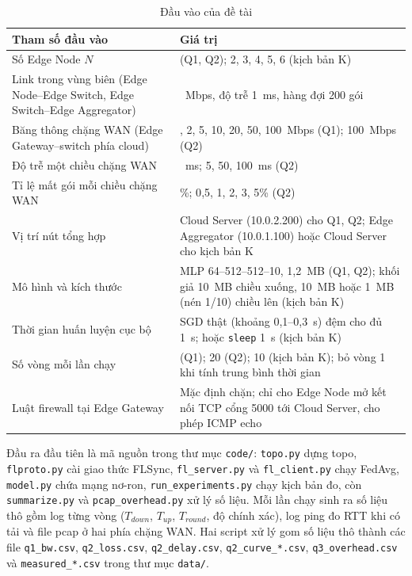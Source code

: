 \begin{table}[H]
    \centering
    \caption{Đầu vào của đề tài}
    \label{tab:input}
    \begin{tabularx}{\textwidth}{>{\raggedright\arraybackslash\hsize=0.8\hsize}X >{\raggedright\arraybackslash\hsize=1.2\hsize}X}
        \toprule
        \textbf{Tham số đầu vào} & \textbf{Giá trị} \\
        \midrule
        Số Edge Node $N$ & 4 (Q1, Q2); 2, 3, 4, 5, 6 (kịch bản K) \\
        \midrule
        Link trong vùng biên (Edge Node--Edge Switch, Edge Switch--Edge Aggregator) & 100~Mbps, độ trễ 1~ms, hàng đợi 200 gói \\
        \midrule
        Băng thông chặng WAN (Edge Gateway--switch phía cloud) & 1, 2, 5, 10, 20, 50, 100~Mbps (Q1); 100~Mbps (Q2) \\
        \midrule
        Độ trễ một chiều chặng WAN & 20~ms; 5, 50, 100~ms (Q2) \\
        \midrule
        Tỉ lệ mất gói mỗi chiều chặng WAN & 0\%; 0{,}5, 1, 2, 3, 5\% (Q2) \\
        \midrule
        Vị trí nút tổng hợp & Cloud Server (10.0.2.200) cho Q1, Q2; Edge Aggregator (10.0.1.100) hoặc Cloud Server cho kịch bản K \\
        \midrule
        Mô hình và kích thước & MLP 64--512--512--10, 1{,}2~MB (Q1, Q2); khối giả 10~MB chiều xuống, 10~MB hoặc 1~MB (nén 1/10) chiều lên (kịch bản K) \\
        \midrule
        Thời gian huấn luyện cục bộ & SGD thật (khoảng 0{,}1--0{,}3~s) đệm cho đủ 1~s; hoặc \texttt{sleep} 1~s (kịch bản K) \\
        \midrule
        Số vòng mỗi lần chạy & 6 (Q1); 20 (Q2); 10 (kịch bản K); bỏ vòng 1 khi tính trung bình thời gian \\
        \midrule
        Luật firewall tại Edge Gateway & Mặc định chặn; chỉ cho Edge Node mở kết nối TCP cổng 5000 tới Cloud Server, cho phép ICMP echo \\
        \bottomrule
    \end{tabularx}
\end{table}

Đầu ra đầu tiên là mã nguồn trong thư mục \texttt{code/}: \texttt{topo.py} dựng topo, \texttt{flproto.py} cài giao thức FLSync, \texttt{fl\_server.py} và \texttt{fl\_client.py} chạy FedAvg, \texttt{model.py} chứa mạng nơ-ron, \texttt{run\_experiments.py} chạy kịch bản đo, còn \texttt{summarize.py} và \texttt{pcap\_overhead.py} xử lý số liệu. Mỗi lần chạy sinh ra số liệu thô gồm log từng vòng ($T_{down}$, $T_{up}$, $T_{round}$, độ chính xác), log ping đo RTT khi có tải và file pcap ở hai phía chặng WAN. Hai script xử lý gom số liệu thô thành các file \texttt{q1\_bw.csv}, \texttt{q2\_loss.csv}, \texttt{q2\_delay.csv}, \texttt{q2\_curve\_*.csv}, \texttt{q3\_overhead.csv} và \texttt{measured\_*.csv} trong thư mục \texttt{data/}.

